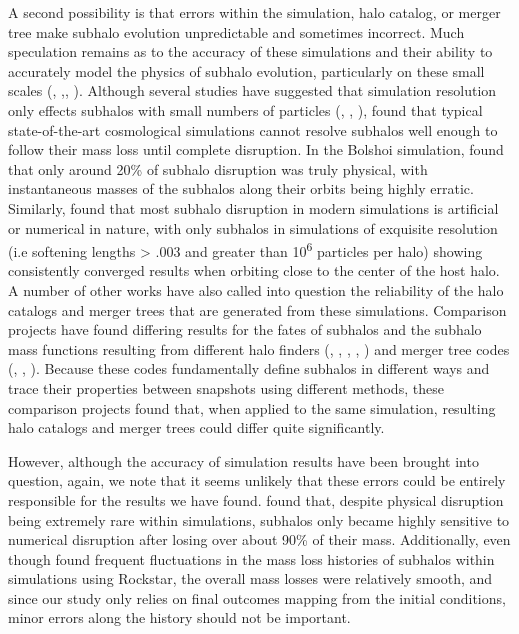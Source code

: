 \documentclass[fleqn,usenatbib]{mnras}
\begin{document}
A second possibility is that errors within the simulation, halo catalog, or merger tree make subhalo evolution unpredictable and sometimes incorrect. Much speculation remains as to the accuracy of these simulations and their ability to accurately model the physics of subhalo evolution, particularly on these small scales (\citet{Kampen2005}, \citet{Taylor2005},\citet{VandenBosch2018}, \citet{Bosch2018}). Although several studies have suggested that simulation resolution only effects subhalos with small numbers of particles (\citet{Gao2004}, \citet{Nurmi2006}, \citet{Diemand2007}), \citet{VandenBosch2018} found that typical state-of-the-art cosmological simulations cannot resolve subhalos well enough to follow their mass loss until complete disruption. In the Bolshoi simulation, \citet{VandenBosch2017} found that only around 20\% of subhalo disruption was truly physical, with instantaneous masses of the subhalos along their orbits being highly erratic. Similarly, \citet{VandenBosch2018} found that most subhalo disruption in modern simulations is artificial or numerical in nature, with only subhalos in simulations of exquisite resolution (i.e softening lengths > .003 and greater than 10\textsuperscript{6} particles per halo) showing consistently converged results when orbiting close to the center of the host halo. A number of other works have also called into question the reliability of the halo catalogs and merger trees that are generated from these simulations. Comparison projects have found differing results for the fates of subhalos and the subhalo mass functions resulting from different halo finders (\citet{Knebe2011}, \citet{Onions2012}, \citet{Avila2014}, \citet{Bosch2014}, \citet{Behroozi2015}) and merger tree codes (\citet{Tweed2009}, \citet{Srisawat2013}, \citet{Jiang2014}). Because these codes fundamentally define subhalos in different ways and trace their properties between snapshots using different methods, these comparison projects found that, when applied to the same simulation, resulting halo catalogs and merger trees could differ quite significantly.

However, although the accuracy of simulation results have been brought into question, again, we note that it seems unlikely that these errors could be entirely responsible for the results we have found. \citet{Bosch2018} found that, despite physical disruption being extremely rare within simulations, subhalos only became highly sensitive to numerical disruption after losing over about 90\% of their mass. Additionally, even though \citet{Avila2014} found frequent fluctuations in the mass loss histories of subhalos within simulations using Rockstar, the overall mass losses were relatively smooth, and since our study only relies on final outcomes mapping from the initial conditions, minor errors along the history should not be important.
\end{document}
